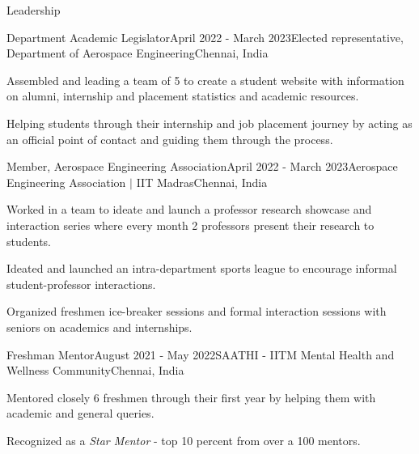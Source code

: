 \documentclass{resume} %
\begin{document}

\begin{rSection}{Leadership}

\begin{rSubsection}{Department Academic Legislator}{April 2022 - March 2023}{Elected representative, Department of Aerospace Engineering}{Chennai, India}
\item Assembled and leading a team of 5 to create a student website with information on alumni, internship and placement statistics and academic resources.
\item Helping students through their internship and job placement journey by acting as an official point of contact and guiding them through the process.
\end{rSubsection}

\begin{rSubsection}{Member, Aerospace Engineering Association}{April 2022 - March 2023}{Aerospace Engineering Association $\vert$ IIT Madras}{Chennai, India}
\item Worked in a team to ideate and launch a professor research showcase and interaction series where every month 2 professors present their research to students.
\item Ideated and launched an intra-department sports league to encourage informal student-professor interactions.
\item Organized freshmen ice-breaker sessions and formal interaction sessions with seniors on academics and internships.
\end{rSubsection}

\begin{rSubsection}{Freshman Mentor}{August 2021 - May 2022}{SAATHI - IITM Mental Health and Wellness Community}{Chennai, India}
\item Mentored closely 6 freshmen through their first year by helping them with academic and general queries.
\item Recognized as a \emph{Star Mentor} - top 10 percent from over a 100 mentors.
\end{rSubsection}

\end{rSection} 

\vspace{-1em}
\end{document}

